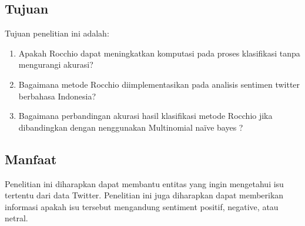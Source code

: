 \subsection*{Tujuan}
Tujuan penelitian ini adalah: 
\begin{enumerate}[noitemsep] 
	\item Apakah Rocchio dapat meningkatkan komputasi pada proses klasifikasi tanpa mengurangi akurasi?
	\item Bagaimana metode Rocchio diimplementasikan pada analisis sentimen twitter berbahasa Indonesia?
	\item Bagaimana perbandingan akurasi hasil klasifikasi metode Rocchio jika dibandingkan dengan nenggunakan Multinomial naïve bayes ?
\end{enumerate}

\subsection*{Manfaat}
Penelitian ini diharapkan dapat membantu entitas yang ingin mengetahui isu tertentu dari data Twitter. Penelitian ini juga diharapkan dapat memberikan informasi apakah isu tersebut mengandung sentiment positif, negative, atau netral.
